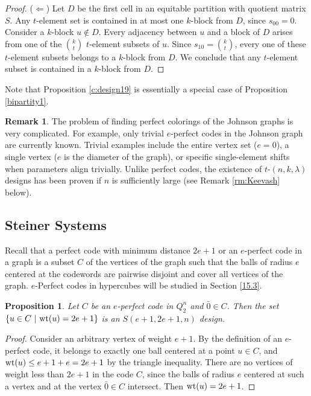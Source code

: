 \documentclass[11pt]{article}
\newtheorem{claim}{Proposition}[section]
\theoremstyle{definition}
\newtheorem{remark}{Remark}[section]
\newcommand{\wt}{{\rm wt}}
\begin{document}
{{{\begin{proof}
($\Leftarrow$) Let  $D$ be the first cell in an equitable partition
 with quotient matrix $S$. Any $t$-element set
is contained in at most one $k$-block from $D$, since
$s_{00}=0$. Consider a $k$-block $u\not \in D$.   Every adjacency between $u$ and a block of $D$ arises from one of the  ${k\choose t}$ $t$-element subsets of $u$. 
Since $s_{10}={k\choose t}$,  every one of these $t$-element subsets belongs to a $k$-block from $D$.  We conclude that any $t$-element subset
is contained in a $k$-block from $D$. \end{proof}

Note that Proposition \ref{c:design19} is essentially a special
case of Proposition \ref{bipartity1}.


\begin{remark}
The problem of finding perfect colorings of the Johnson graphs is very complicated.
For example, only trivial $e$-perfect codes in the Johnson graph are currently known. Trivial examples include the entire vertex set ($e=0$), a single vertex ($e$ is the diameter of the graph), or specific single-element shifts when parameters align trivially. Unlike perfect codes, the existence of 
 $t$-$(n,k,\lambda)$ designs has been proven if $n$ is sufficiently large   (see Remark \ref{rm:Keevash} below).
\end{remark}

\subsection{Steiner Systems}

Recall that a perfect code with minimum distance $2e+1$ or
an $e$-perfect code in a graph is a subset $C$
of the vertices of the graph such that the balls of radius $e$ centered at the codewords are pairwise disjoint and cover all vertices  of the graph. 
$e$-Perfect codes in hypercubes will be studied  in Section \ref{15.3}.

\begin{claim}
Let $C$ be an $e$-perfect code in $Q^n_2$ and $\bar{0}\in C$. Then
the set $\{u\in C \ |\ \wt(u)=2e+1\}$ is an $S(e+1,2e+1,n)$
design.
\end{claim}
\begin{proof}
Consider an arbitrary vertex of weight $e+1$. By the definition of an
$e$-perfect code, it belongs to exactly one ball centered at a
point $u\in C$, and $\wt(u)\leq e+1 +e=2e+1$ by the triangle inequality. There are no vertices of weight less than $2e+1$ in the code $C$, since
the balls of radius $e$ centered at such a vertex and at the vertex $\bar{0}\in
C$ intersect.  Then $\wt(u)=2e+1$.
\end{proof}

}}}
\end{document}

